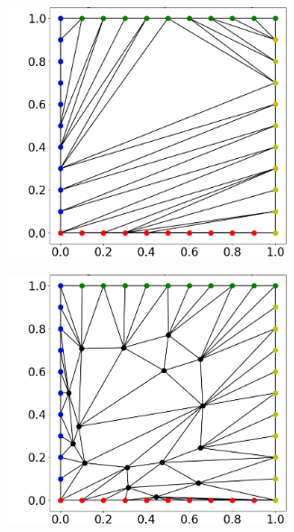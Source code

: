 \begin{figure}
  \begin{subfigure}[t]{0.31\textwidth}%
    \centering%
    \includegraphics[width=0.9\textwidth, trim=37mm 14mm 6mm 6mm, clip]{images/fiber_creation/mesh_plots/out_0_1_0_tri.png}%
    \label{fig:w_01}%
  \end{subfigure}
  \quad
  \begin{subfigure}[t]{0.31\textwidth}%
    \centering%
    \includegraphics[width=0.9\textwidth, trim=37mm 14mm 6mm 6mm, clip]{images/fiber_creation/mesh_plots/out_1_1_0_tri.png}%
    \label{fig:w_11}%
  \end{subfigure}

\end{figure}
